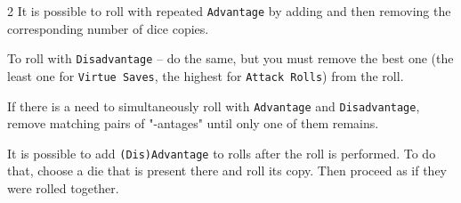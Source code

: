 \begin{multicols*}{2}
It is possible to roll with repeated \texttt{Advantage} by adding and then removing the corresponding number of dice copies.

To roll with \texttt{Disadvantage} -- do the same, but you must remove the best one (the least one for \texttt{Virtue Saves}, the highest for \texttt{Attack Rolls}) from the roll.

If there is a need to simultaneously roll with \texttt{Advantage} and \texttt{Disadvantage}, remove matching pairs of "-antages" until only one of them remains.

It is possible to add \texttt{(Dis)Advantage} to rolls after the roll is performed.
To do that, choose a die that is present there and roll its copy.
Then proceed as if they were rolled together.


\end{multicols*}
